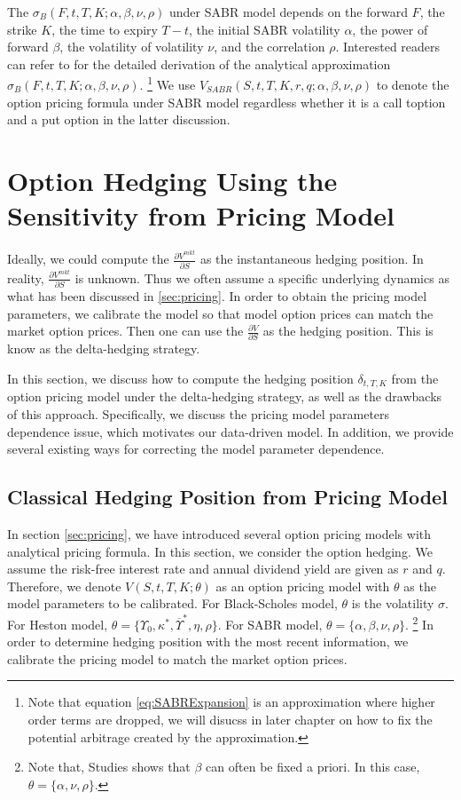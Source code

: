 \documentclass[letterpaper,12pt,titlepage,oneside,final]{book}
\numberwithin{equation}{section}
\theoremstyle{definition}
\newcommand{\Vmkt}{V^{mkt}}
\begin{document}
The $\sigma_{B}(F,t,T,K;\alpha,\beta,\nu,\rho)$ under SABR model depends on the forward $F$, the strike $K$, the time to expiry $T-t$, the initial SABR volatility $\alpha$, the power of forward $\beta$, the volatility of volatility $\nu$, and the correlation $\rho$.  Interested readers can refer to \cite{hagan2002managing} for the detailed derivation of the analytical approximation $\sigma_{B}(F,t,T,K;\alpha,\beta,\nu,\rho)$. \footnote{Note that equation \eqref{eq:SABRExpansion} is an approximation where higher order terms are dropped, we will disucss in later chapter on how to fix the potential arbitrage created by the approximation.}
We use $V_{SABR}(S,t,T,K,r,q;\alpha,\beta,\nu,\rho)$ to denote the option pricing formula under SABR model regardless whether it is a call toption and a put option  in the latter discussion.



\section{Option Hedging Using the Sensitivity from Pricing Model}
 Ideally, we could compute the $\frac{\partial \Vmkt}{\partial S}$ as the instantaneous hedging position. In reality, $\frac{\partial \Vmkt}{\partial S}$ is unknown. Thus we often assume a specific underlying dynamics as what has been discussed in \ref{sec:pricing}. In order to obtain the pricing model parameters, we calibrate the model so that model option prices can match the market option prices. Then one can use the $\frac{\partial V}{\partial S}$ as the hedging position. This is know as the delta-hedging strategy.

 In this section, we discuss how to compute the hedging position $\delta_{t,T,K}$ from the option pricing model under the delta-hedging strategy, as well as the drawbacks of this approach.  Specifically, we discuss the pricing model parameters dependence issue, which motivates our data-driven model. In addition, we provide several existing ways for correcting the model parameter dependence. 


\subsection{Classical Hedging Position from Pricing Model}
\label{sec:Classical}
In section \ref{sec:pricing}, we have introduced several option pricing models with analytical pricing formula. In this section, we consider the option hedging.  We assume the risk-free interest rate and annual dividend yield are given as $r$ and $q$. Therefore, we denote  $V(S,t,T,K;\theta)$  as an option pricing model with $\theta$ as the model parameters to be calibrated. For Black-Scholes model,  $\theta$ is the volatility $\sigma$. For Heston model, $\theta=\{\Upsilon_0,\kappa^*,\overline{\Upsilon}^*,\eta,\rho \}$. For SABR model, $\theta=\{\alpha,\beta,\nu,\rho \}$. \footnote{Note that, Studies \cite{hulloptimal,hagan2002managing,hagan2017bartlett} shows that $\beta$ can often be fixed a priori. In this case, $\theta=\{\alpha,\nu,\rho \}$.} In order to determine hedging position with the most recent information, we calibrate the pricing model to match the market option prices. 
\end{document}
